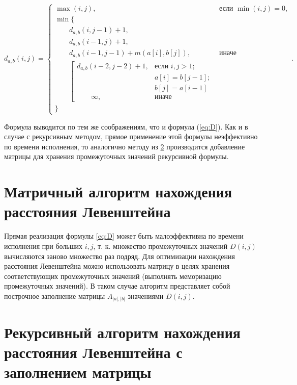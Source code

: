 \documentclass[12pt]{report}
\begin{document}
\begin{equation}
\label{eq:d}
d_{a,b}(i, j) = \begin{cases}
\max(i, j), &\text{если }\min(i, j) = 0,\\
\min \lbrace \\
\qquad d_{a,b}(i, j-1) + 1,\\
\qquad d_{a,b}(i-1, j) + 1,\\
\qquad d_{a,b}(i-1, j-1) + m(a[i], b[j]), &\text{иначе}\\
\qquad \left[ \begin{array}{cc}d_{a,b}(i-2, j-2) + 1, &\text{если }i,j > 1;\\
\qquad &\text{}a[i] = b[j-1]; \\
\qquad &\text{}b[j] = a[i-1]\\
\qquad \infty, & \text{иначе}\end{array}\right.\\
\rbrace
\end{cases}.
\end{equation}

Формула выводится по тем же соображениям, что и формула (\ref{eq:D}).
Как и в случае с рекурсивным методом, прямое применение этой формулы неэффективно по времени исполнения, то аналогично методу из \ref{sec:recmat} производится добавление матрицы для хранения промежуточных значений рекурсивной формулы.



\section{Матричный алгоритм нахождения расстояния Левенштейна}

Прямая реализация формулы \ref{eq:D} может быть малоэффективна по времени исполнения при больших $i, j$, т. к. множество промежуточных значений $D(i, j)$ вычисляются заново множество раз подряд. Для оптимизации нахождения расстояния Левенштейна можно использовать матрицу в целях хранения соответствующих промежуточных значений (выполнять меморизацию промежуточных значений). В таком случае алгоритм представляет собой построчное заполнение матрицы $A_{|a|,|b|}$ значениями $D(i, j)$.


\section{Рекурсивный алгоритм нахождения расстояния Левенштейна с заполнением матрицы}

\label{sec:recmat}
\end{document}
